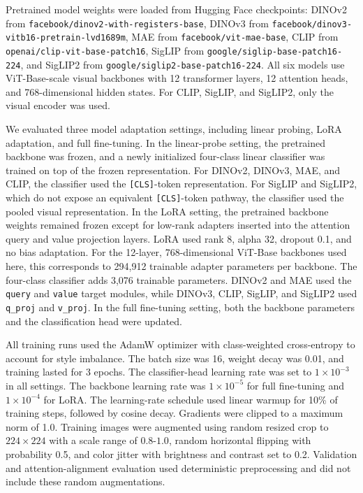 \documentclass[lineno,pdflatex,sn-mathphys-num]{sn-jnl}%
\theoremstyle{thmstyleone}%
\theoremstyle{thmstyletwo}%
\theoremstyle{thmstylethree}%
\begin{document}
Pretrained model weights were loaded from Hugging Face checkpoints: DINOv2 from \texttt{facebook/dinov2-with-registers-base}, DINOv3 from \texttt{facebook/dinov3-vitb16-pretrain-lvd1689m}, MAE from \texttt{facebook/vit-mae-base}, CLIP from \texttt{openai/clip-vit-base-patch16}, SigLIP from \texttt{google/siglip-base-patch16-224}, and SigLIP2 from \texttt{google/siglip2-base-patch16-224}. All six models use ViT-Base-scale visual backbones with 12 transformer layers, 12 attention heads, and 768-dimensional hidden states. For CLIP, SigLIP, and SigLIP2, only the visual encoder was used.

We evaluated three model adaptation settings, including linear probing, LoRA adaptation, and full fine-tuning. In the linear-probe setting, the pretrained backbone was frozen, and a newly initialized four-class linear classifier was trained on top of the frozen representation. For DINOv2, DINOv3, MAE, and CLIP, the classifier used the \texttt{[CLS]}-token representation. For SigLIP and SigLIP2, which do not expose an equivalent \texttt{[CLS]}-token pathway, the classifier used the pooled visual representation. In the LoRA setting, the pretrained backbone weights remained frozen except for low-rank adapters inserted into the attention query and value projection layers. LoRA used rank 8, alpha 32, dropout 0.1, and no bias adaptation. For the 12-layer, 768-dimensional ViT-Base backbones used here, this corresponds to 294,912 trainable adapter parameters per backbone. The four-class classifier adds 3,076 trainable parameters. DINOv2 and MAE used the \texttt{query} and \texttt{value} target modules, while DINOv3, CLIP, SigLIP, and SigLIP2 used \texttt{q\_proj} and \texttt{v\_proj}. In the full fine-tuning setting, both the backbone parameters and the classification head were updated.

All training runs used the AdamW optimizer with class-weighted cross-entropy to account for style imbalance. The batch size was 16, weight decay was 0.01, and training lasted for 3 epochs. The classifier-head learning rate was set to $1 \times 10^{-3}$ in all settings. The backbone learning rate was $1 \times 10^{-5}$ for full fine-tuning and $1 \times 10^{-4}$ for LoRA. The learning-rate schedule used linear warmup for 10\% of training steps, followed by cosine decay. Gradients were clipped to a maximum norm of 1.0. Training images were augmented using random resized crop to $224 \times 224$ with a scale range of $0.8$-$1.0$, random horizontal flipping with probability 0.5, and color jitter with brightness and contrast set to 0.2. Validation and attention-alignment evaluation used deterministic preprocessing and did not include these random augmentations.
\end{document}
